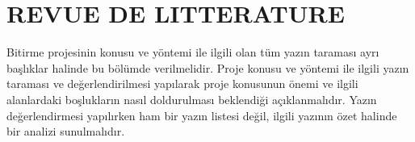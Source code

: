 \chapter{REVUE DE LITTERATURE}
\thispagestyle{empty}

Bitirme projesinin konusu ve yöntemi ile ilgili olan tüm yazın taraması ayrı başlıklar halinde bu bölümde verilmelidir. Proje konusu ve yöntemi ile ilgili yazın taraması ve değerlendirilmesi yapılarak proje konusunun önemi ve ilgili alanlardaki boşlukların nasıl doldurulması beklendiği açıklanmalıdır. Yazın değerlendirmesi yapılırken ham bir yazın listesi değil, ilgili yazının özet halinde bir analizi sunulmalıdır.